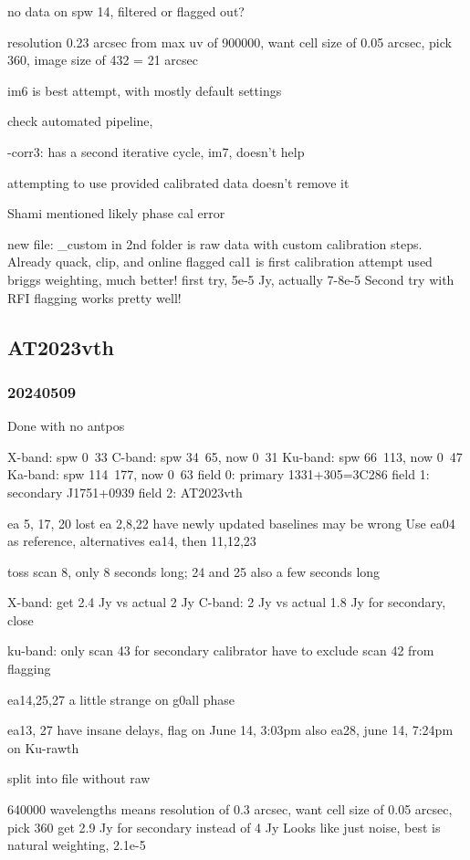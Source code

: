 \documentclass[twocolumn,twocolappendix]{aastex631}
\begin{document}
no data on spw 14, filtered or flagged out?

resolution 0.23 arcsec from max uv of 900000, want cell size of 0.05 arcsec, pick 360, image size of 432 = 21 arcsec 

im6 is best attempt, with mostly default settings

check automated pipeline,

-corr3: has a second iterative cycle, im7, doesn't help

attempting to use provided calibrated data doesn't remove it

Shami mentioned likely phase cal error

new file: \_custom in 2nd folder is raw data with custom calibration steps.  Already quack, clip, and online flagged
cal1 is first calibration attempt
used briggs weighting, much better!  first try, 5e-5 Jy, actually 7-8e-5
Second try with RFI flagging works pretty well!


\subsection{AT2023vth}
\subsubsection{20240509}
Done with no antpos

X-band: spw 0~33
C-band: spw 34~65, now 0~31
Ku-band: spw 66~113, now 0~47
Ka-band: spw 114~177, now 0~63
field 0: primary 1331+305=3C286
field 1: secondary J1751+0939
field 2: AT2023vth

ea 5, 17, 20 lost
ea 2,8,22 have newly updated baselines may be wrong
Use ea04 as reference, alternatives ea14, then 11,12,23

toss scan 8, only 8 seconds long; 24 and 25 also a few seconds long

X-band: get 2.4 Jy vs actual 2 Jy
C-band:
2 Jy vs actual 1.8 Jy for secondary, close 

ku-band:
only scan 43 for secondary calibrator
have to exclude scan 42 from flagging

ea14,25,27 a little strange on g0all phase

ea13, 27 have insane delays, flag on June 14, 3:03pm
also ea28, june 14, 7:24pm on Ku-rawth

split into file without raw

640000 wavelengths means resolution of 0.3 arcsec, want cell size of 0.05 arcsec, pick 360
get 2.9 Jy for secondary instead of 4 Jy
Looks like just noise, best is natural weighting, 2.1e-5
\end{document}
